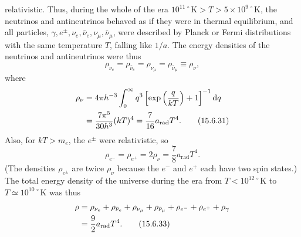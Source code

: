 relativistic. Thus, during the whole of the era
\(10^{11\,\circ}\mathrm K>T>5\times10^{9\,\circ}\mathrm K\), the neutrinos
and antineutrinos behaved as if they were in thermal equilibrium, and all
particles, \(\gamma,e^\pm,\nu_e,\bar\nu_e,\nu_\mu,\bar\nu_\mu\), were
described by Planck or Fermi distributions with the same temperature \(T\),
falling like \(1/a\). The energy densities of the neutrinos and antineutrinos
were thus
\begin{equation}
  \rho_{\nu_e}
  =
  \rho_{\bar\nu_e}
  =
  \rho_{\nu_\mu}
  =
  \rho_{\bar\nu_\mu}
  \equiv
  \rho_\nu,
  \tag{15.6.30}\label{eq:15.6.30}
\end{equation}
where
\begin{align}
  \rho_\nu
  &=
  4\pi h^{-3}\int_0^\infty
  q^3\left[\exp\left(\frac q{kT}\right)+1\right]^{-1}\mathop{}\!\mathrm{d} q
  \notag\\
  &=
  \frac{7\pi^5}{30h^3}(kT)^4
  =
  \frac7{16}a_{\mathrm{rad}}T^4.
  \tag{15.6.31}\label{eq:15.6.31}
\end{align}
Also, for \(kT>m_e\), the \(e^\pm\) were relativistic, so
\begin{equation}
  \rho_{e^-}
  =
  \rho_{e^+}
  =
  2\rho_\nu
  =
  \frac78a_{\mathrm{rad}}T^4.
  \tag{15.6.32}\label{eq:15.6.32}
\end{equation}
(The densities \(\rho_{e^\pm}\) are twice \(\rho_\nu\) because the \(e^-\)
and \(e^+\) each have two spin states.) The total energy density of the
universe during the era from \(T<10^{12\,\circ}\mathrm K\) to
\(T\simeq10^{10\,\circ}\mathrm K\) was thus
\begin{align}
  \rho
  &=
  \rho_{\nu_e}+\rho_{\bar\nu_e}
  +\rho_{\nu_\mu}+\rho_{\bar\nu_\mu}
  +\rho_{e^-}+\rho_{e^+}+\rho_\gamma
  \notag\\
  &=
  \frac92a_{\mathrm{rad}}T^4.
  \tag{15.6.33}\label{eq:15.6.33}
\end{align}

